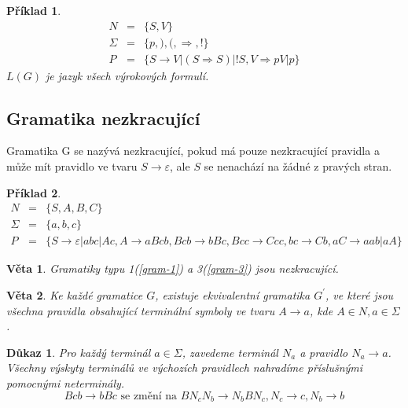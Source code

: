 \documentclass[10pt, a4paper, titlepage]{article}
\theoremstyle{note}
\newtheorem{veta}{\textbf{Věta}}
\newtheorem{dukaz}{\textbf{Důkaz}}
\newtheorem{priklad}{\textbf{Příklad}}
\begin{document}
\begin{priklad}
\begin{eqnarray*}
N &=& \lbrace S, V \rbrace \\
\Sigma &=& \lbrace p,),(, \Rightarrow, ! \rbrace \\
P &=& \lbrace S \rightarrow V|(S \Rightarrow S)|!S, V \Rightarrow pV|p \rbrace
\end{eqnarray*}
$L(G)$ je jazyk všech výrokových formulí.
\end{priklad}



\subsection{Gramatika nezkracující}
Gramatika G se nazývá nezkracující, pokud má pouze nezkracující pravidla a může mít pravidlo ve tvaru $S \rightarrow \varepsilon$, ale $S$ se nenachází na žádné z pravých stran.

\begin{priklad}
\begin{eqnarray*}
N &=& \lbrace S, A, B, C\rbrace \\
\Sigma &=& \lbrace a, b, c\rbrace \\
P &=& \lbrace S \rightarrow \varepsilon |abc|Ac, A \rightarrow aBcb, Bcb \rightarrow bBc, Bcc \rightarrow Ccc, bc \rightarrow Cb, aC \rightarrow aab|aA \rbrace
\end{eqnarray*}
\end{priklad}

\begin{veta}
Gramatiky typu 1(\ref{gram-1}) a 3(\ref{gram-3}) jsou nezkracující.
\end{veta}

\begin{veta}
Ke každé gramatice $G$, existuje ekvivalentní gramatika $G^{'}$, ve které jsou všechna pravidla obsahující terminální symboly ve tvaru $A \rightarrow a$, kde $A \in N, a \in \Sigma$.
\end{veta}

\begin{dukaz}
Pro každý terminál $a \in \Sigma$, zavedeme terminál $N_{a}$ a pravidlo $N_{a} \rightarrow a$.
Všechny výskyty terminálů ve výchozích pravidlech nahradíme příslušnými pomocnými neterminály.
$$
Bcb \rightarrow bBc \text{ se změní na } BN_{c}N_{b} \rightarrow N_{b} BN_{c}, 
N_{c} \rightarrow c, N_{b} \rightarrow b
$$
\end{dukaz}
\end{document}
